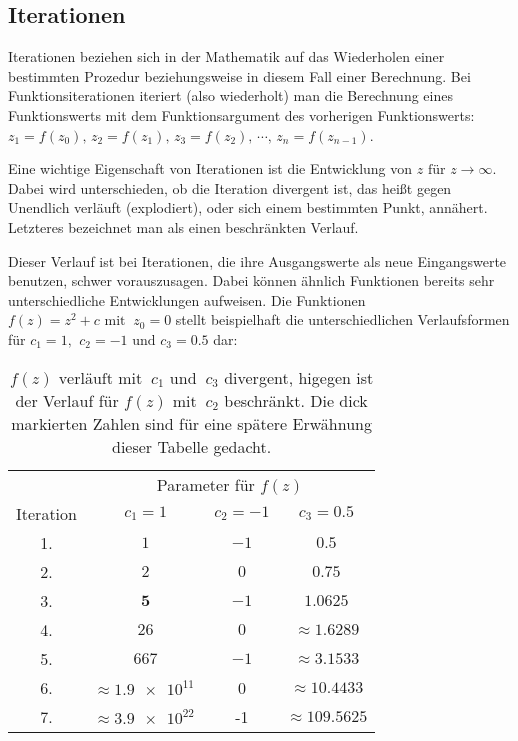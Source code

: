 \subsection{Iterationen}\label{subsec:iterations}

Iterationen beziehen sich in der Mathematik auf das Wiederholen einer bestimmten
Prozedur beziehungsweise in diesem Fall einer Berechnung.
Bei Funktionsiterationen iteriert (also wiederholt) man die Berechnung eines
Funktionswerts mit dem Funktionsargument des vorherigen Funktionswerts:
$z_1 = f(z_0),\, z_2 = f(z_1),\, z_3 = f(z_2),\, \cdots,\, z_n = f(z_{n-1})$.

Eine wichtige Eigenschaft von Iterationen ist die Entwicklung von
$z \text{ für } z \to \infty$.
Dabei wird unterschieden, ob die Iteration divergent ist,
das heißt gegen Unendlich verl\"auft (\glqq explodiert\grqq),
oder sich einem bestimmten Punkt, ann\"ahert.
Letzteres bezeichnet man als einen beschränkten Verlauf.

Dieser Verlauf ist bei Iterationen, die ihre Ausgangswerte als neue Eingangswerte
benutzen, schwer vorauszusagen.
Dabei k\"onnen \"ahnlich Funktionen bereits sehr unterschiedliche Entwicklungen aufweisen.
Die Funktionen $f(z) = z^2 + c \text{ mit }\ z_0 = 0$ stellt beispielhaft
die unterschiedlichen Verlaufsformen für
$c_1 = 1 \text{, }\ c_2 = -1 \text{ und } c_3 = 0.5$ dar:

\begin{table}[h!]
  \centering
  \begin{tabular}{@{}cccc@{}}
    \toprule
    & \multicolumn{3}{c}{Parameter für $f(z)$} \\
    \cmidrule(lr){2-4}
    Iteration & $ c_1 = 1$ & $ c_2 = -1$ & $ c_3 = 0.5$ \\
    \midrule
    1. & $1$ & $-1$ & $0.5$ \\
    2. & $2$ & $0$ & $0.75$ \\
    3. & $\boldsymbol{5}$ & $-1$ & $1.0625$ \\
    4. & $26$ & $0$ & $\approx 1.6289 $ \\
    5. & $667$ & $-1$ & $\approx \boldsymbol{3.1533} $ \\
    6. & $\approx \num{1,9e11}\ $ & 0 & $\approx 10.4433 $ \\
    7. & $\approx \num{3,9e22}\ $ & -1 & $\approx 109.5625 $ \\
    \bottomrule
  \end{tabular}
  \caption{
    $f(z) \text{ verl\"auft mit }\ c_1 \text{ und }\ c_3$ divergent,
    higegen ist der Verlauf f\"ur $f(z) \text{ mit }\ c_2$ beschr\"ankt.
    Die dick markierten Zahlen sind für eine spätere Erwähnung dieser Tabelle
    gedacht.
  }
  \label{tab:iterations-example}
\end{table}